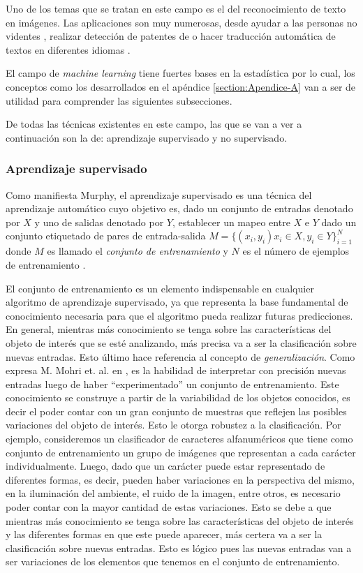 	Uno de los temas que se tratan en este campo es el del reconocimiento de texto en imágenes. Las aplicaciones son muy numerosas, desde ayudar a las personas no videntes \cite{Optelec}, realizar detección de patentes de \cite{DAB} o hacer traducción automática de textos en diferentes idiomas \cite{WordLens}.
	 
	 El campo de \textit{machine learning} tiene fuertes bases en la estadística por lo cual, los conceptos como los desarrollados en el apéndice \ref{section:Apendice-A} van a ser de utilidad para comprender las siguientes subsecciones.
	 
	 De todas las técnicas existentes en este campo, las que se van a ver a continuación son la de: aprendizaje supervisado y no supervisado.
	 	
	\subsubsection{Aprendizaje supervisado}
	
	Como manifiesta Murphy, el aprendizaje supervisado es una técnica del aprendizaje automático cuyo objetivo es, dado un conjunto de entradas denotado por $X$ y uno de salidas denotado por $Y$, establecer un mapeo entre $X$ e $Y$ dado un conjunto etiquetado de pares de entrada-salida $M=\{(x_i,y_i) x_i \in X, y_i \in Y \}^{N}_{i=1}$ donde $M$ es llamado el \textit{conjunto de entrenamiento} y $N$ es el número de ejemplos de entrenamiento \cite{Murphy12}.
	
	El conjunto de entrenamiento es un elemento indispensable en cualquier algoritmo de aprendizaje supervisado, ya que representa la base fundamental de conocimiento necesaria para que el algoritmo pueda realizar futuras predicciones. En general, mientras más conocimiento se tenga sobre las características del objeto de interés que se esté analizando, más precisa va a ser la clasificación sobre nuevas entradas. Esto último hace referencia al concepto de \textit{generalización}. Como expresa M. Mohri et. al. en \cite{MMohri}, es la habilidad de interpretar con precisión nuevas entradas luego de haber ``experimentado'' un conjunto de entrenamiento. Este conocimiento se construye a partir de la variabilidad de los objetos conocidos, es decir el poder contar con un gran conjunto de muestras que reflejen las posibles variaciones del objeto de interés. Esto le otorga robustez a la clasificación. Por ejemplo, consideremos un clasificador de caracteres alfanuméricos que tiene como conjunto de entrenamiento un grupo de imágenes que representan a cada carácter individualmente. Luego, dado que un carácter puede estar representado de diferentes formas, es decir, pueden haber variaciones en la perspectiva del mismo, en la iluminación del ambiente, el ruido de la imagen, entre otros, es necesario poder contar con la mayor cantidad de estas variaciones. Esto se debe a que mientras más conocimiento se tenga sobre las características del objeto de interés y las diferentes formas en que este puede aparecer, más certera va a ser la clasificación sobre nuevas entradas. Esto es lógico pues las nuevas entradas van a ser variaciones de los elementos que tenemos en el conjunto de entrenamiento.
	
